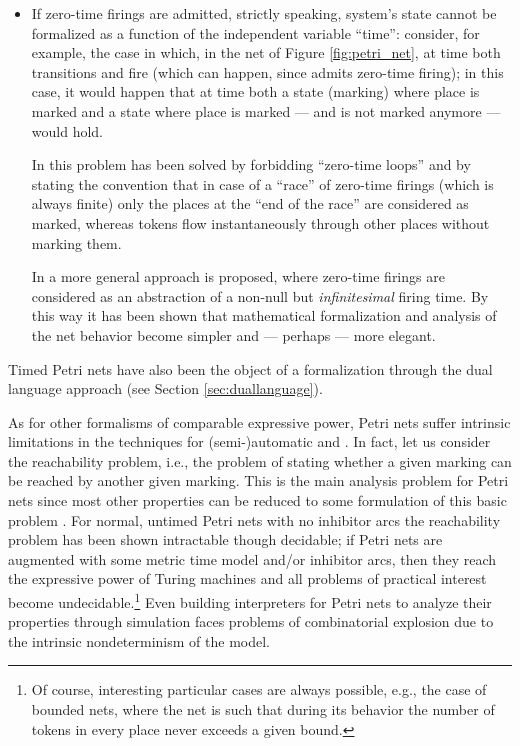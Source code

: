 \begin{itemize}
\begin{itemize}
  \item If zero-time firings are admitted, strictly speaking, system's 
	 state cannot be formalized as a function of the independent variable 
	 ``time'': consider, for example, the case in which, in the net 
	 of Figure \ref{fig:petri_net}, at time  both transitions  and  fire
	 (which can happen, since  admits zero-time firing); in this case, it 
	 would happen that at time  both a state (marking) where 
	 place  is marked and a state where place  is marked 
	 --- and  is not marked anymore --- would hold.

	 In \cite{FMM94} this problem has been solved by forbidding ``zero-time 
	 loops'' and by stating the convention that in case of a ``race'' 
	 of zero-time firings (which is always finite) only the places 
	 at the ``end of the race'' are considered as marked, whereas tokens 
	 flow instantaneously through other places without marking them. 

	 In \cite{GMM99} a more general approach is proposed, where zero-time 
	 firings are considered as an abstraction of a non-null but \emph{infinitesimal} 
	 firing time. By this way it has been shown that mathematical 
	 formalization and analysis of the net behavior become simpler 
	 and --- perhaps --- more elegant.
    \end{itemize}
\end{itemize}

Timed Petri nets have also been the object of a formalization through 
the dual language approach (see Section \ref{sec:duallanguage}).

As for other formalisms of comparable expressive power, Petri nets
suffer intrinsic limitations in the techniques for (semi-)automatic
 and . In fact, let us consider the reachability
problem, i.e., the problem of stating whether a given marking can be
reached by another given marking. This is the main analysis problem
for Petri nets since most other properties can be reduced to some
formulation of this basic problem \cite{Pet81}. For normal, untimed
Petri nets with no inhibitor arcs the reachability problem has been
shown intractable though decidable; if Petri nets are augmented with
some metric time model and/or inhibitor arcs, then they reach the
expressive power of Turing machines and all problems of practical
interest become undecidable.\footnote{Of course, interesting
  particular cases are always possible, e.g., the case of bounded
  nets, where the net is such that during its behavior the number of
  tokens in every place never exceeds a given bound.} Even building
interpreters for Petri nets to analyze their properties through
simulation faces problems of combinatorial explosion due to the
intrinsic nondeterminism of the model.

